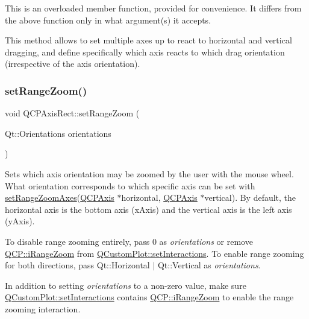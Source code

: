 This is an overloaded member function, provided for convenience. It differs from the above function only in what argument(s) it accepts.

This method allows to set multiple axes up to react to horizontal and vertical dragging, and define specifically which axis reacts to which drag orientation (irrespective of the axis orientation). \mbox{\label{class_q_c_p_axis_rect_a7960a9d222f1c31d558b064b60f86a31}} 
\subsubsection{\texorpdfstring{setRangeZoom()}{setRangeZoom()}}
{\footnotesize\ttfamily void Q\+C\+P\+Axis\+Rect\+::set\+Range\+Zoom (\begin{DoxyParamCaption}\item[{Qt\+::\+Orientations}]{orientations }\end{DoxyParamCaption})}

Sets which axis orientation may be zoomed by the user with the mouse wheel. What orientation corresponds to which specific axis can be set with \mbox{\hyperlink{class_q_c_p_axis_rect_a9442cca2aa358405f39a64d51eca13d2}{set\+Range\+Zoom\+Axes}}(\mbox{\hyperlink{class_q_c_p_axis}{Q\+C\+P\+Axis}} $\ast$horizontal, \mbox{\hyperlink{class_q_c_p_axis}{Q\+C\+P\+Axis}} $\ast$vertical). By default, the horizontal axis is the bottom axis (x\+Axis) and the vertical axis is the left axis (y\+Axis).

To disable range zooming entirely, pass 0 as {\itshape orientations} or remove \mbox{\hyperlink{namespace_q_c_p_a2ad6bb6281c7c2d593d4277b44c2b037abee1e94353525a636aeaf0ba32b72e14}{Q\+C\+P\+::i\+Range\+Zoom}} from \mbox{\hyperlink{class_q_custom_plot_a5ee1e2f6ae27419deca53e75907c27e5}{Q\+Custom\+Plot\+::set\+Interactions}}. To enable range zooming for both directions, pass {\ttfamily Qt\+::\+Horizontal $\vert$ Qt\+::\+Vertical} as {\itshape orientations}.

In addition to setting {\itshape orientations} to a non-\/zero value, make sure \mbox{\hyperlink{class_q_custom_plot_a5ee1e2f6ae27419deca53e75907c27e5}{Q\+Custom\+Plot\+::set\+Interactions}} contains \mbox{\hyperlink{namespace_q_c_p_a2ad6bb6281c7c2d593d4277b44c2b037abee1e94353525a636aeaf0ba32b72e14}{Q\+C\+P\+::i\+Range\+Zoom}} to enable the range zooming interaction.

